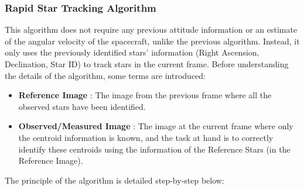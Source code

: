 \documentclass[../../main.tex]{subfiles}
\begin{document}
\subsubsection{Rapid Star Tracking Algorithm}
This algorithm does not require any previous attitude information or an estimate of the angular velocity of the spacecraft, unlike the previous algorithm. Instead, it only uses the previously identified stars' information (Right Ascension, Declination, Star ID) to track stars in the current frame. Before understanding the details of the algorithm, some terms are introduced:
\begin{itemize}
    \item \textbf{Reference Image} : The image from the previous frame where all the observed stars have been identified.
    \item \textbf{Observed/Measured Image} : The image at the current frame where only the centroid information is known, and the task at hand is to correctly identify these centroids using the information of the Reference Stars (in the Reference Image). 
\end{itemize}
The principle of the algorithm is detailed step-by-step below:
\end{document}
